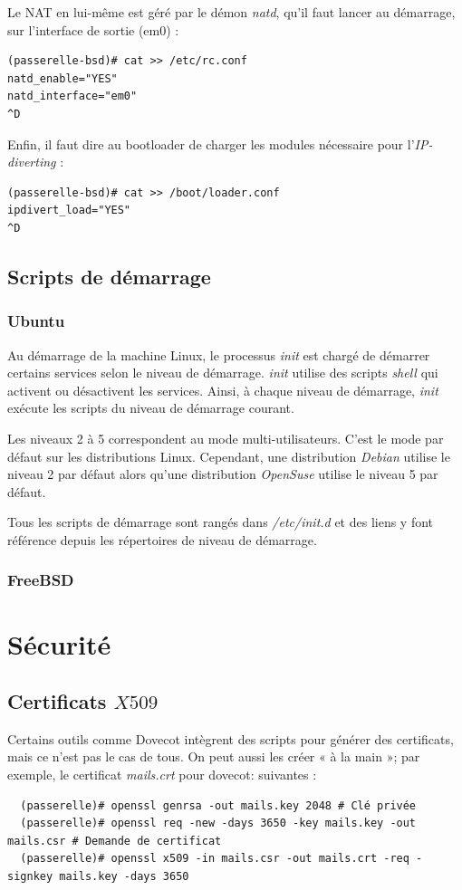 \documentclass[a4paper]{article}
\begin{document}
Le NAT en lui-même est géré par le démon \textit{natd}, qu'il faut lancer
au démarrage, sur l'interface de sortie (em$0$) :
\begin{verbatim}
(passerelle-bsd)# cat >> /etc/rc.conf
natd_enable="YES"
natd_interface="em0"
^D
\end{verbatim}

Enfin, il faut dire au bootloader de charger les modules nécessaire
pour l'\textit{IP-diverting} :
\begin{verbatim}
(passerelle-bsd)# cat >> /boot/loader.conf
ipdivert_load="YES"
^D
\end{verbatim}

\subsection{Scripts de démarrage}
\subsubsection{Ubuntu}
Au démarrage de la machine Linux, le processus \textit{init} 
est chargé de démarrer certains services selon le niveau de démarrage.
\textit{init} utilise des scripts \textit{shell} qui activent ou désactivent
les services. Ainsi, à chaque niveau de démarrage, \textit{init} exécute
les scripts du niveau de démarrage courant.

Les niveaux 2 à 5 correspondent au mode multi-utilisateurs. C'est le mode
par défaut sur les distributions Linux. Cependant, une distribution 
\textit{Debian} utilise le niveau 2 par défaut alors qu'une distribution
\textit{OpenSuse} utilise le niveau 5 par défaut.

Tous les scripts de démarrage sont rangés dans \textit{/etc/init.d} et
des liens y font référence depuis les répertoires de niveau de démarrage.
\subsubsection{FreeBSD}

\section{Sécurité}
\subsection{Certificats $X509$}
Certains outils comme Dovecot intègrent des scripts pour générer des certificats,
mais ce n'est pas le cas de tous. On peut aussi les créer « à la main »;
par exemple, le certificat \textit{mails.crt} pour dovecot:
suivantes :
\begin{verbatim}
  (passerelle)# openssl genrsa -out mails.key 2048 # Clé privée
  (passerelle)# openssl req -new -days 3650 -key mails.key -out mails.csr # Demande de certificat
  (passerelle)# openssl x509 -in mails.csr -out mails.crt -req -signkey mails.key -days 3650 
\end{verbatim}
\end{document}
